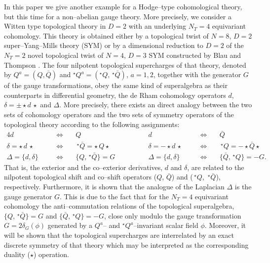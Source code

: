\documentclass[a4paper,11pt]{article}
\begin{document}
In this paper we give another example for a Hodge--type cohomological theory, 
but this time for a non--abelian gauge theory. More precisely, we consider 
a Witten type topological theory in $D = 2$ with an underlying $N_T = 4$ 
equivariant cohomology. This theory is obtained either by a topological 
twist of $N = 8$, $D = 2$ super--Yang--Mills theory (SYM) \cite{15} or by a 
dimensional reduction to $D = 2$ of the $N_T = 2$ novel topological twist of 
$N = 4$, $D = 3$ SYM constructed by Blau and Thompson \cite{16}. The four 
nilpotent topological supercharges of that theory, 
denoted by $Q^a = (Q, \bar{Q})$ and 
$^\star Q^a = (^\star Q, \,^\star \bar{Q})$, $a = 1,2$, together with the 
generator $G$ of the gauge transformations, obey the same 
kind of superalgebra as their counterparts in differential geometry,
the de Rham cohomology operators $d$, $\delta = \pm \star d\, \star$ 
and $\Delta$. More precisely, there exists an direct analogy between 
the two sets of cohomology operators and the two sets of symmetry operators 
of the topological theory according to the following assignments:  
\begin{alignat}{4}
\label{2.1}
d 
&\quad &\Leftrightarrow \quad&
Q
&\qquad\qquad 
d 
&\quad &\Leftrightarrow \quad&
\bar{Q}
\nonumber
\\
\delta = \star\, d\, \star 
&\quad &\Leftrightarrow \quad&
\,^\star \bar{Q} = \star\, Q \star
&\qquad\qquad
\delta = - \star d\, \star 
&\quad &\Leftrightarrow \quad&
\,^\star Q = - \star \bar{Q} \star
\\
\Delta = \{ d, \delta \} 
&\quad &\Leftrightarrow \quad&
\{ Q, \,^\star \bar{Q} \} = G
&\qquad\qquad
\Delta = \{ d, \delta \} 
&\quad &\Leftrightarrow \quad&
\{ \bar{Q}, \,^\star Q \} = - G.
\nonumber
\end{alignat}
That is, the exterior and the co--exterior derivatives, $d$ and $\delta$,
are related to the nilpotent topological shift and co--shift operators
($Q$, $\bar{Q}$) and ($\,^\star Q$, $\,^\star \bar{Q}$), respectively.
 Furthermore, it is shown that the analogue of the Laplacian $\Delta$  
is the gauge generator $G$. This is due to the fact that for the 
$N_T = 4$ equivariant cohomology the anti--commutation relations of the 
topological superalgebra, $\{ Q, \,^\star \bar{Q} \} = G$ and 
$\{ \bar{Q}, \,^\star Q \} = - G$, close only modulo the gauge transformation 
$G =2 \delta_G(\phi)$ generated by a $Q^a$-- and $^\star Q^a$--invariant 
scalar field $\phi$. 
Moreover, it will be shown that the topological supercharges are 
interrelated by an exact discrete symmetry of that theory which may be
interpreted as the corresponding duality ($\star$) operation. 
\end{document}
